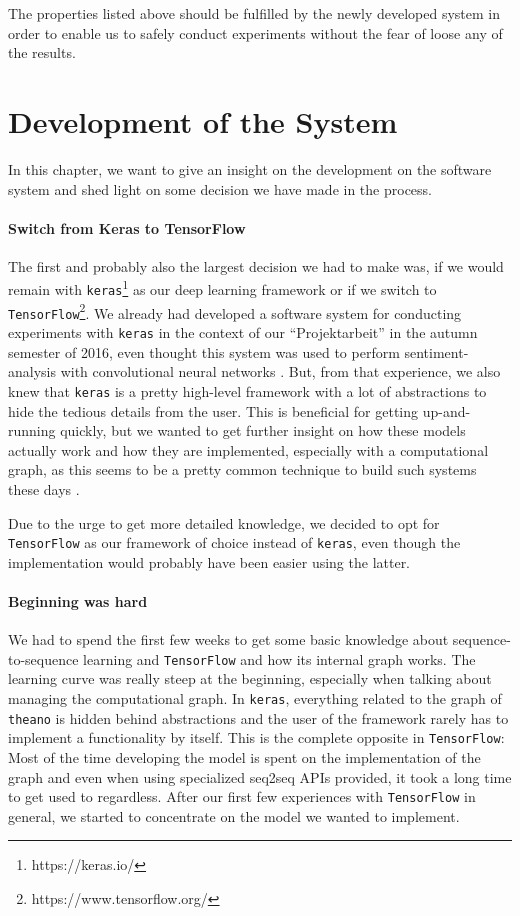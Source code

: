 The properties listed above should be fulfilled by the newly developed system in order to enable us to safely conduct experiments without the fear of loose any of the results.

\section{Development of the System}
\label{sofware_system:development_history}
In this chapter, we want to give an insight on the development on the software system and shed light on some decision we have made in the process.

\paragraph{Switch from Keras to TensorFlow} The first and probably also the largest decision we had to make was, if we would remain with \texttt{keras}\footnote{https://keras.io/} as our deep learning framework or if we switch to \texttt{TensorFlow}\footnote{https://www.tensorflow.org/}. We already had developed a software system for conducting experiments with \texttt{keras} in the context of our ``Projektarbeit'' in the autumn semester of 2016, even thought this system was used to perform sentiment-analysis with convolutional neural networks \cite{Vongruenigen:2017}. But, from that experience, we also knew that \texttt{keras} is a pretty high-level framework with a lot of abstractions to hide the tedious details from the user. This is beneficial for getting up-and-running quickly, but we wanted to get further insight on how these models actually work and how they are implemented, especially with a computational graph, as this seems to be a pretty common technique to build such systems these days \cite{TensorFlow:2015}\cite{Theano:2016}\cite{Torch:2011}.

Due to the urge to get more detailed knowledge, we decided to opt for \texttt{TensorFlow} as our framework of choice instead of \texttt{keras}, even though the implementation would probably have been easier using the latter.
\paragraph{Beginning was hard} We had to spend the first few weeks to get some basic knowledge about sequence-to-sequence learning and \texttt{TensorFlow} and how its internal graph works. The learning curve was really steep at the beginning, especially when talking about managing the computational graph. In \texttt{keras}, everything related to the graph of \texttt{theano} is hidden behind abstractions and the user of the framework rarely has to implement a functionality by itself. This is the complete opposite in \texttt{TensorFlow}: Most of the time developing the model is spent on the implementation of the graph and even when using specialized seq2seq APIs provided, it took a long time to get used to regardless. After our first few experiences with \texttt{TensorFlow} in general, we started to concentrate on the model we wanted to implement.

